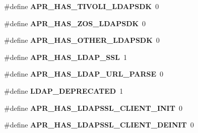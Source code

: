 \begin{DoxyCompactItemize}
\item 
\hypertarget{group___a_p_r___util___l_d_a_p_gad46b9586b73ac6e51a02831275f8b04e}{\#define {\bfseries A\-P\-R\-\_\-\-H\-A\-S\-\_\-\-T\-I\-V\-O\-L\-I\-\_\-\-L\-D\-A\-P\-S\-D\-K}~0}\label{group___a_p_r___util___l_d_a_p_gad46b9586b73ac6e51a02831275f8b04e}

\item 
\hypertarget{group___a_p_r___util___l_d_a_p_gaaf7c4fb35087815ead3905b61df10791}{\#define {\bfseries A\-P\-R\-\_\-\-H\-A\-S\-\_\-\-Z\-O\-S\-\_\-\-L\-D\-A\-P\-S\-D\-K}~0}\label{group___a_p_r___util___l_d_a_p_gaaf7c4fb35087815ead3905b61df10791}

\item 
\hypertarget{group___a_p_r___util___l_d_a_p_ga23badc30790c00670f7d32485aef644f}{\#define {\bfseries A\-P\-R\-\_\-\-H\-A\-S\-\_\-\-O\-T\-H\-E\-R\-\_\-\-L\-D\-A\-P\-S\-D\-K}~0}\label{group___a_p_r___util___l_d_a_p_ga23badc30790c00670f7d32485aef644f}

\item 
\hypertarget{group___a_p_r___util___l_d_a_p_ga82632b7263e6bd4c944984973a64fc01}{\#define {\bfseries A\-P\-R\-\_\-\-H\-A\-S\-\_\-\-L\-D\-A\-P\-\_\-\-S\-S\-L}~1}\label{group___a_p_r___util___l_d_a_p_ga82632b7263e6bd4c944984973a64fc01}

\item 
\hypertarget{group___a_p_r___util___l_d_a_p_gae27df06dee7eea38e01e5e62bceea878}{\#define {\bfseries A\-P\-R\-\_\-\-H\-A\-S\-\_\-\-L\-D\-A\-P\-\_\-\-U\-R\-L\-\_\-\-P\-A\-R\-S\-E}~0}\label{group___a_p_r___util___l_d_a_p_gae27df06dee7eea38e01e5e62bceea878}

\item 
\hypertarget{group___a_p_r___util___l_d_a_p_ga773186efdfc921b5370ec02876fd69f5}{\#define {\bfseries L\-D\-A\-P\-\_\-\-D\-E\-P\-R\-E\-C\-A\-T\-E\-D}~1}\label{group___a_p_r___util___l_d_a_p_ga773186efdfc921b5370ec02876fd69f5}

\item 
\hypertarget{group___a_p_r___util___l_d_a_p_ga6e822ba31223c57fc9c3cd2b4fb86605}{\#define {\bfseries A\-P\-R\-\_\-\-H\-A\-S\-\_\-\-L\-D\-A\-P\-S\-S\-L\-\_\-\-C\-L\-I\-E\-N\-T\-\_\-\-I\-N\-I\-T}~0}\label{group___a_p_r___util___l_d_a_p_ga6e822ba31223c57fc9c3cd2b4fb86605}

\item 
\hypertarget{group___a_p_r___util___l_d_a_p_gad65f3166d487725db8d6f55b0d201d18}{\#define {\bfseries A\-P\-R\-\_\-\-H\-A\-S\-\_\-\-L\-D\-A\-P\-S\-S\-L\-\_\-\-C\-L\-I\-E\-N\-T\-\_\-\-D\-E\-I\-N\-I\-T}~0}\label{group___a_p_r___util___l_d_a_p_gad65f3166d487725db8d6f55b0d201d18}


\end{DoxyCompactItemize}
